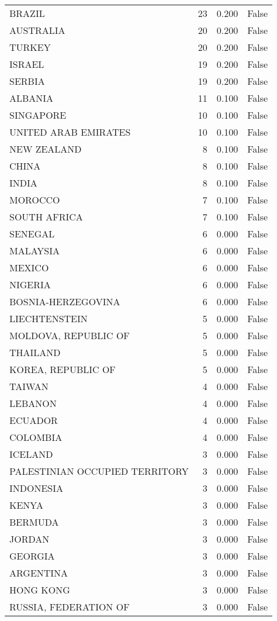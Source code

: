 \begin{tabular}{lrrr}
BRAZIL & 23 & 0.200 & False \\
AUSTRALIA & 20 & 0.200 & False \\
TURKEY & 20 & 0.200 & False \\
ISRAEL & 19 & 0.200 & False \\
SERBIA & 19 & 0.200 & False \\
ALBANIA & 11 & 0.100 & False \\
SINGAPORE & 10 & 0.100 & False \\
UNITED ARAB EMIRATES & 10 & 0.100 & False \\
NEW ZEALAND & 8 & 0.100 & False \\
CHINA & 8 & 0.100 & False \\
INDIA & 8 & 0.100 & False \\
MOROCCO & 7 & 0.100 & False \\
SOUTH AFRICA & 7 & 0.100 & False \\
SENEGAL & 6 & 0.000 & False \\
MALAYSIA & 6 & 0.000 & False \\
MEXICO & 6 & 0.000 & False \\
NIGERIA & 6 & 0.000 & False \\
BOSNIA-HERZEGOVINA & 6 & 0.000 & False \\
LIECHTENSTEIN & 5 & 0.000 & False \\
MOLDOVA, REPUBLIC OF & 5 & 0.000 & False \\
THAILAND & 5 & 0.000 & False \\
KOREA, REPUBLIC OF & 5 & 0.000 & False \\
TAIWAN & 4 & 0.000 & False \\
LEBANON & 4 & 0.000 & False \\
ECUADOR & 4 & 0.000 & False \\
COLOMBIA & 4 & 0.000 & False \\
ICELAND & 3 & 0.000 & False \\
PALESTINIAN OCCUPIED TERRITORY & 3 & 0.000 & False \\
INDONESIA & 3 & 0.000 & False \\
KENYA & 3 & 0.000 & False \\
BERMUDA & 3 & 0.000 & False \\
JORDAN & 3 & 0.000 & False \\
GEORGIA & 3 & 0.000 & False \\
ARGENTINA & 3 & 0.000 & False \\
HONG KONG & 3 & 0.000 & False \\
RUSSIA, FEDERATION OF & 3 & 0.000 & False \\

\end{tabular}
